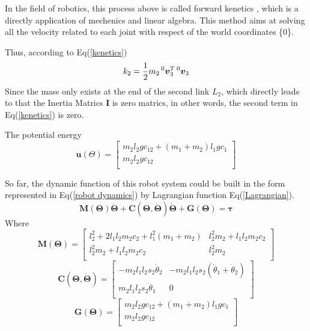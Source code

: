 \documentclass[a4paper]{article}
\begin{document}
In the field of robotics, this process above is called forward kenetics , which is a directly application of mechenics and linear algebra. This method aims at solving all the velocity related to each joint with respect of the world coordinates \{0\}. 

Thus, according to Eq(\ref{kenetics})
\begin{equation}
   k_2 = \frac{1}{2} m_2 \prescript{0}{}{\boldsymbol{v}}_{3}^T \prescript{0}{}{\boldsymbol{v}}_3
\end{equation}
Since the mass only exists at the end of the second link $L_2$, which directly leads to that the Inertia Matrics $\boldsymbol{I}$ is zero matrics, in other words, the second term in Eq(\ref{kenetics}) is zero. 

The potential energy 
\begin{equation}
\boldsymbol{u}(\Theta) = 
\left[
\begin{matrix}
m_2l_2gc_{12}+(m_1+m_2)l_1gc_1  \\
m_2l_2gc_{12} \\
\end{matrix}
\right ]
\end{equation}

So far, the dynamic function of this robot system could be built in the form represented in Eq(\ref{robot dynamics}) by Lagrangian function Eq(\ref{Lagrangian}). 
\begin{equation}
\boldsymbol{M(\Theta) \ddot{\Theta}}+\boldsymbol{C(\Theta,\dot{\Theta})\dot{\Theta}}+\boldsymbol{G(\Theta)} = \boldsymbol{\tau}  
\label{robot arm}
\end{equation}
Where
\begin{equation}
\boldsymbol{M(\Theta)} = 
\left[
\begin{matrix}
l_2^2+2l_1l_2m_2c_2+l_1^2(m_1+m_2) &l_2^2m_2+l_1l_2m_2c_2  \\
l_2^2m_2+l_1l_2m_2c_2 &l_2^2m_2 \\
\end{matrix}
\right ]
\end{equation}
\begin{equation}
\boldsymbol{C(\Theta,\dot{\Theta})} = 
\left[
\begin{matrix}
-m_2l_1l_2s_2\dot\theta_2 & -m_2l_1l_2s_2(\dot\theta_1+\dot\theta_2)  \\
m_2l_1l_2s_2\dot\theta_1 & 0 \\
\end{matrix}
\right ]
\end{equation}
\begin{equation}
\boldsymbol{G(\Theta)} = 
\left[
\begin{matrix}
m_2l_2gc_{12}+(m_1+m_2)l_1gc_1  \\
m_2l_2gc_{12} \\
\end{matrix}
\right ]
\end{equation}
\end{document}
